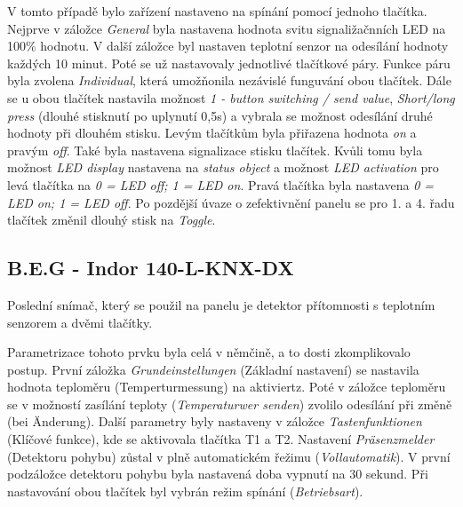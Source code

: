\newpage V tomto případě bylo zařízení nastaveno na spínání pomocí jednoho tlačítka. Nejprve v záložce \textit{General} byla nastavena hodnota svitu signaližačnních LED na 100\% hodnotu. V další záložce byl nastaven teplotní senzor na odesílání hodnoty každých 10 minut. Poté se už nastavovaly jednotlivé tlačítkové páry. Funkce páru byla zvolena \textit{Individual}, která umožňonila nezávislé funguvání obou tlačítek. Dále se u obou tlačítek nastavila možnost \textit{1 - button switching / send value}, \textit{Short/long press} (dlouhé stisknutí po uplynutí 0,5s) a vybrala se možnost odesílání druhé hodnoty při dlouhém stisku. Levým tlačítkům byla přiřazena hodnota \textit{on} a pravým \textit{off}. Také byla nastavena signalizace stisku tlačítek. Kvůli tomu byla možnost \textit{LED display} nastavena na \textit{status object} a možnost \textit{LED activation} pro levá tlačítka na \textit{0 = LED off; 1 = LED on}. Pravá tlačítka byla nastavena \textit{0 = LED on; 1 = LED off}. Po pozdější úvaze o zefektivnění panelu se pro 1. a 4. řadu tlačítek změnil dlouhý stisk na \textit{Toggle}.  

\subsection{B.E.G - Indor 140-L-KNX-DX}
Poslední snímač, který se použil na panelu je detektor přítomnosti s teplotním senzorem a dvěmi tlačítky. \cite{BEG}

Parametrizace tohoto prvku byla celá v němčině, a to dosti zkomplikovalo postup. První záložka \textit{Grundeinstellungen} (Základní nastavení) se nastavila hodnota teploměru (Temperturmessung) na aktiviertz. Poté v záložce teploměru se v možností zasílání teploty (\textit{Temperaturwer senden}) zvolilo odesílání při změně (bei Änderung). Další parametry byly nastaveny v záložce \textit{Tastenfunktionen} (Klíčové funkce), kde se aktivovala tlačítka T1 a T2. Nastavení \textit{Präsenzmelder} (Detektoru pohybu) zůstal v plně automatickém řežimu (\textit{Vollautomatik}). V první podzáložce detektoru pohybu byla nastavená doba vypnutí na 30 sekund. Při nastavování obou tlačítek byl vybrán režim spínání (\textit{Betriebsart}).

